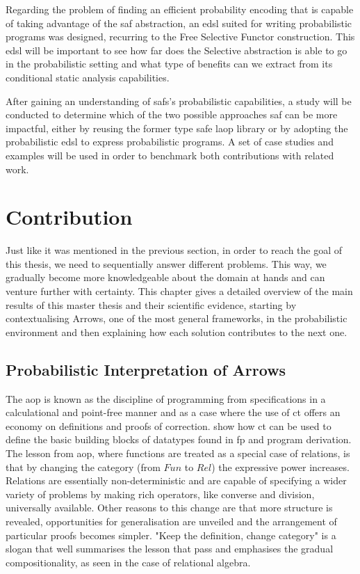 \documentclass[
  oneside,
  11pt, a4paper,
  footinclude=true,
  headinclude=true,
  cleardoublepage=empty
]{scrbook}
\theoremstyle{definition}
\theoremstyle{definition}
\begin{document}
	Regarding the problem of finding an efficient probability encoding that is capable of taking advantage of the \gls{saf} abstraction, an \gls{edsl} suited for writing probabilistic programs was designed, recurring to the Free Selective Functor construction. This \gls{edsl} will be important to see how far does the Selective abstraction is able to go in the probabilistic setting and what type of benefits can we extract from its conditional static analysis capabilities.
	
    After gaining an understanding of \glspl{saf}'s probabilistic capabilities, a study will be conducted to determine which of the two possible approaches \gls{saf} can be more impactful, either by reusing the former type safe \gls{laop} library or by adopting the probabilistic \gls{edsl} to express probabilistic programs. A set of case studies and examples will be used in order to benchmark both contributions with related work.
    
    \chapter{Contribution}\label{sec-current-work}
	
	    Just like it was mentioned in the previous section, in order to reach the goal of this thesis, we need to sequentially answer different problems. This way, we gradually become more knowledgeable about the domain at hands and can venture further with certainty. This chapter gives a detailed overview of the main results of this master thesis and their scientific evidence, starting by contextualising Arrows, one of the most general frameworks, in the probabilistic environment and then explaining how each solution contributes to the next one.
	    
	    \section{Probabilistic Interpretation of Arrows}
	    
	        The \gls{aop} \citep{Bird:1997:AP:248932} is known as the discipline of programming from specifications in a calculational and point-free manner and as a case where the use of \gls{ct} offers an economy on definitions and proofs of correction. \cite{Bird:1997:AP:248932} show how \gls{ct} can be used to define the basic building blocks of datatypes found in \gls{fp} and program derivation. The lesson from \gls{aop}, where functions are treated as a special case of relations, is that by changing the category (from $Fun$ to $Rel$) the expressive power increases. Relations are essentially non-deterministic and are capable of specifying a wider variety of problems by making rich operators, like converse and division, universally available. Other reasons to this change are that more structure is revealed, opportunities for generalisation are unveiled and the arrangement of particular proofs becomes simpler. "Keep the definition, change category" is a slogan that well summarises the lesson that \cite{Bird:1997:AP:248932} pass and emphasises the gradual compositionality, as seen in the case of relational algebra.
	        
\end{document}

